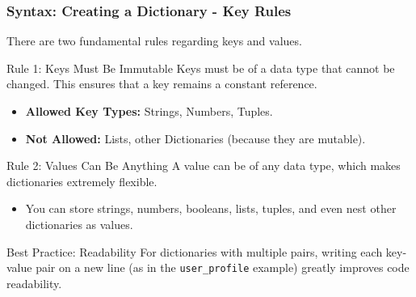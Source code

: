\documentclass{beamer}
\begin{document}
\begin{frame}[fragile]
    \frametitle{Syntax: Creating a Dictionary - Key Rules}
    There are two fundamental rules regarding keys and values.

    \begin{block}{Rule 1: Keys Must Be Immutable}
        Keys must be of a data type that cannot be changed. This ensures that a key remains a constant reference.
        \begin{itemize}
            \item \textbf{Allowed Key Types:} Strings, Numbers, Tuples.
            \item \textbf{Not Allowed:} Lists, other Dictionaries (because they are mutable).
        \end{itemize}
    \end{block}

    \begin{block}{Rule 2: Values Can Be Anything}
        A value can be of any data type, which makes dictionaries extremely flexible.
        \begin{itemize}
            \item You can store strings, numbers, booleans, lists, tuples, and even nest other dictionaries as values.
        \end{itemize}
    \end{block}

    \begin{alertblock}{Best Practice: Readability}
        For dictionaries with multiple pairs, writing each key-value pair on a new line (as in the \texttt{user\_profile} example) greatly improves code readability.
    \end{alertblock}
\end{frame}
\end{document}
